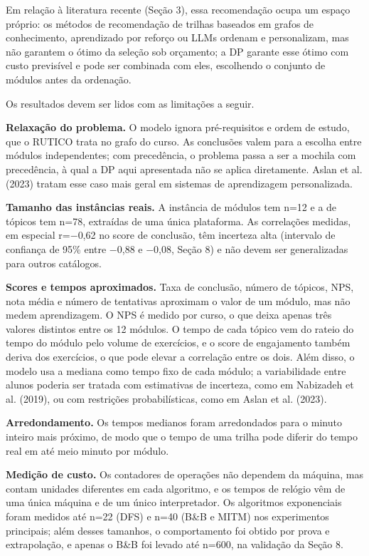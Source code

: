 \documentclass[12pt,a4paper]{article}
\newcommand{\secao}[1]{\par\vspace{1.2em}\noindent{\bfseries #1}\par\vspace{0.8em}\nopagebreak}
\begin{document}
Em relação à literatura recente (Seção 3), essa recomendação ocupa um espaço próprio: os métodos de recomendação de trilhas baseados em grafos de conhecimento, aprendizado por reforço ou LLMs ordenam e personalizam, mas não garantem o ótimo da seleção sob orçamento; a DP garante esse ótimo com custo previsível e pode ser combinada com eles, escolhendo o conjunto de módulos antes da ordenação.

\secao{10 LIMITAÇÕES}
Os resultados devem ser lidos com as limitações a seguir.

\textbf{Relaxação do problema.} O modelo ignora pré-requisitos e ordem de estudo, que o RUTICO trata no grafo do curso. As conclusões valem para a escolha entre módulos independentes; com precedência, o problema passa a ser a mochila com precedência, à qual a DP aqui apresentada não se aplica diretamente. Aslan et al. (2023) tratam esse caso mais geral em sistemas de aprendizagem personalizada.

\textbf{Tamanho das instâncias reais.} A instância de módulos tem n=12 e a de tópicos tem n=78, extraídas de uma única plataforma. As correlações medidas, em especial r=\ensuremath{-}0,62 no score de conclusão, têm incerteza alta (intervalo de confiança de 95\% entre \ensuremath{-}0,88 e \ensuremath{-}0,08, Seção 8) e não devem ser generalizadas para outros catálogos.

\textbf{Scores e tempos aproximados.} Taxa de conclusão, número de tópicos, NPS, nota média e número de tentativas aproximam o valor de um módulo, mas não medem aprendizagem. O NPS é medido por curso, o que deixa apenas três valores distintos entre os 12 módulos. O tempo de cada tópico vem do rateio do tempo do módulo pelo volume de exercícios, e o score de engajamento também deriva dos exercícios, o que pode elevar a correlação entre os dois. Além disso, o modelo usa a mediana como tempo fixo de cada módulo; a variabilidade entre alunos poderia ser tratada com estimativas de incerteza, como em Nabizadeh et al. (2019), ou com restrições probabilísticas, como em Aslan et al. (2023).

\textbf{Arredondamento.} Os tempos medianos foram arredondados para o minuto inteiro mais próximo, de modo que o tempo de uma trilha pode diferir do tempo real em até meio minuto por módulo.

\textbf{Medição de custo.} Os contadores de operações não dependem da máquina, mas contam unidades diferentes em cada algoritmo, e os tempos de relógio vêm de uma única máquina e de um único interpretador. Os algoritmos exponenciais foram medidos até n=22 (DFS) e n=40 (B\&B e MITM) nos experimentos principais; além desses tamanhos, o comportamento foi obtido por prova e extrapolação, e apenas o B\&B foi levado até n=600, na validação da Seção 8.
\end{document}
